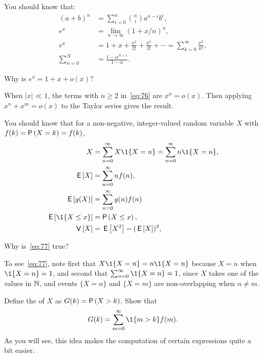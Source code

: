You should know that:
\begin{subequations}
  \begin{align}
    (a+b)^n &= \sum_{i=0}^n {n \choose i} a^{n-i} b^i, \label{eq:71}\\
e^x &= \lim_{n\to\infty} (1+x/n)^n, \label{eq:65}\\
    e^x &= 1 + x + \frac{x^2}{2!} + \frac{x^3}{3!} + \cdots = \sum_{k=0}^{\infty} \frac{x^k}{k!}, \label{eq:76}\\
    \sum_{n=0}^N &= \frac{1-\alpha^{N+1}}{1-\alpha}. \label{eq:61}
\end{align}
\end{subequations}

\begin{extra}\label{ex:87}
  Why is $e^{x} = 1 +x + o(x)$?
\begin{solution}
    When $|x|\ll 1$, the  terms with $n\geq 2$ in~\cref{eq:76} are $x^n = o(x)$. Then applying $x^n + x^m = o(x)$ to the Taylor series gives the result.
\end{solution}
\end{extra}


You should know that for a non-negative, integer-valued random variable $X$ with   $f(k)= \P{X = k} = f(k)$, 
\begin{subequations}
\begin{align}
X&=\sum_{n=0}^\infty X\1{X=n} = \sum_{n=0}^\infty n \1{X=n},   \label{eq:77} \\
\E X &= \sum_{n=0}^\infty n f(n), \\
\E{g(X)} &= \sum_{n=0}^\infty g(n) f(n)  \label{eq:66}\\
\E{\1{X\leq x}} &= \P{X\leq x}, \label{eq:74}\\
\V X &= \E{X^2} - (\E X)^2,\label{eq:68}
\end{align}
\end{subequations}

\begin{extra}
  Why is~\cref{eq:77} true?
\begin{solution}
To see~\cref{eq:77}, note first that $X\1{X=n} = n\1{X=n}$ because $X=n$ when $\1{X=n} =1$, and second that $\sum_{n=0}^\infty \1{X=n} =1$, since $X$ takes one of the values in $\mathbb{N}$, and events $\{X=n\}$ and $\{X=m\}$ are non-overlapping when $n\neq m$. 
\end{solution}
\end{extra}

\begin{exercise}
Define the   of $X$ as $G(k) = \P{X>k}$. Show that
\begin{equation*}
  G(k) = \sum_{m=0}^\infty \1{m>k} f(m).
\end{equation*}
As you will see, this idea  makes the computation of certain expressions quite a bit easier. 
\end{exercise}

